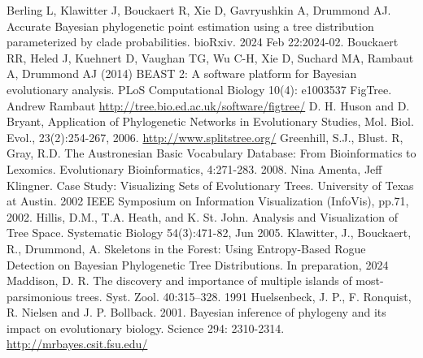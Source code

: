 \documentclass{article}
\begin{document}

\begin{thebibliography}{1}
Berling L, Klawitter J, Bouckaert R, Xie D, Gavryushkin A, Drummond AJ. Accurate Bayesian phylogenetic point estimation using a tree distribution parameterized by clade probabilities. bioRxiv. 2024 Feb 22:2024-02.
Bouckaert RR, Heled J, Kuehnert D, Vaughan TG, Wu C-H, Xie D, Suchard MA,
Rambaut A, Drummond AJ (2014) BEAST 2: A software platform for Bayesian
evolutionary analysis. PLoS Computational Biology 10(4): e1003537
FigTree. Andrew Rambaut
\url{http://tree.bio.ed.ac.uk/software/figtree/}
D. H. Huson and D. Bryant, Application of Phylogenetic Networks in Evolutionary Studies, Mol. Biol. Evol., 23(2):254-267, 2006.
\url{http://www.splitstree.org/}
Greenhill, S.J., Blust. R, Gray, R.D. The Austronesian Basic Vocabulary Database: From Bioinformatics to Lexomics. Evolutionary Bioinformatics, 4:271-283. 2008.
Nina Amenta, Jeff Klingner.
Case Study: Visualizing Sets of Evolutionary Trees.
University of Texas at Austin.
2002 IEEE Symposium on Information Visualization (InfoVis), pp.71, 2002.
Hillis, D.M., T.A. Heath, and K. St. John.
Analysis and Visualization of Tree Space. 
Systematic Biology 54(3):471-82, Jun 2005.
Klawitter, J., Bouckaert, R., Drummond, A.
Skeletons in the Forest: Using Entropy-Based Rogue Detection on Bayesian Phylogenetic Tree Distributions.
In preparation,
2024
Maddison, D. R. 
The discovery and importance of multiple islands of most-parsimonious trees. 
Syst. Zool. 40:315–328. 1991
Huelsenbeck, J. P., F. Ronquist, R. Nielsen and J. P. Bollback. 2001. Bayesian inference of phylogeny and its impact on evolutionary biology. Science 294: 2310-2314.
\url{http://mrbayes.csit.fsu.edu/}
\end{thebibliography}
\end{document}
